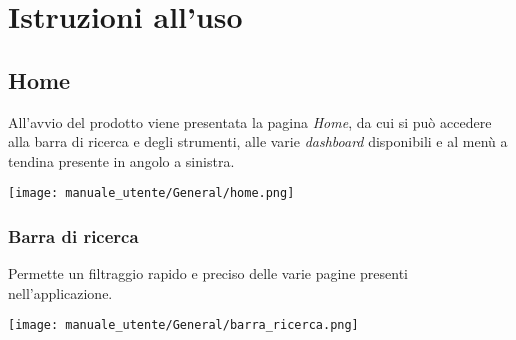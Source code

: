 \section{Istruzioni all'uso}
\subsection{Home}
All'avvio del prodotto viene presentata la pagina \textit{Home}, da cui si può accedere alla barra di ricerca e degli strumenti, alle varie \textit{dashboard} disponibili e al menù a tendina presente in angolo a sinistra.
\begin{center}
    \texttt{[image: manuale\_utente/General/home.png]}
\end{center}
\newpage
\subsubsection{Barra di ricerca}
Permette un filtraggio rapido e preciso delle varie pagine presenti nell'applicazione. 
\begin{center}
    \texttt{[image: manuale\_utente/General/barra\_ricerca.png]}
\end{center}

